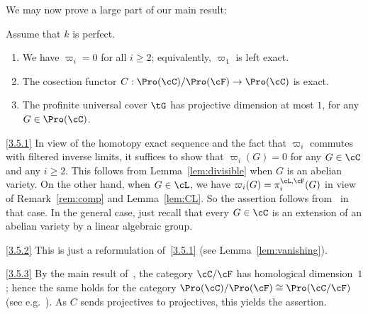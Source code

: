 We may now prove a large part of our main result:

\begin{theo}\label{thm:perfect}
Assume that $k$ is perfect.
\begin{enumerate}\romanenumi
\item \label{3.5.1} We have $\varpi_i = 0$ for all $i \geq 2$; equivalently, $\varpi_1$ is left exact.
\item \label{3.5.2} The cosection functor $C : \Pro(\cC)/\Pro(\cF) \to \Pro(\cC)$ is exact.
\item \label{3.5.3} The profinite universal cover $\tG$ has projective dimension at most $1$, for any $G \in \Pro(\cC)$.
\end{enumerate}
\end{theo}

\begin{proofc}
\begin{step}{\eqref{3.5.1}}%
In view of the homotopy exact sequence and the fact that $\varpi_i$ commutes with filtered inverse limits, it suffices to show that $\varpi_i(G) = 0$ for any $G \in \cC$ and any $i \geq 2$. This follows from Lemma~\ref{lem:divisible} when $G$ is an abelian variety. On the other hand, when $G \in \cL$, we have $\varpi_i(G) = \pi_i^{\cL,\cF}(G)$ in view of Remark~\ref{rem:comp} and Lemma~\ref{lem:CL}. So the assertion follows from~\cite[V.3.6.8]{DG} in that case. In the general case, just recall that every $G \in \cC$ is an extension of an abelian variety by a linear algebraic group.
\end{step}

\begin{step}{\eqref{3.5.2}}%
This is just a reformulation of~\eqref{3.5.1} (see Lemma~\ref{lem:vanishing}).
\end{step}

\begin{laststep}{\eqref{3.5.3}}%
By the main result of~\cite{Br17a}, the category $\cC/\cF$ has homological dimension~$1$; hence the same holds for the category $\Pro(\cC)/\Pro(\cF) \cong \Pro(\cC/\cF)$ (see e.g.~\cite[Prop.~2.12, Lem.~2.15]{Br17b}). As $C$ sends projectives to projectives, this yields the assertion.
\end{laststep}
\let\qed\relax
\end{proofc}

